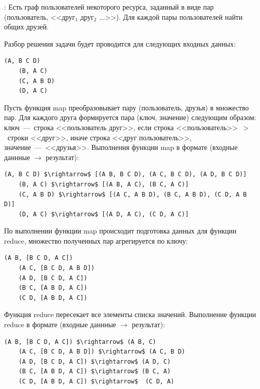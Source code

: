 \documentclass[12pt,a4paper,oneside]{extarticle}
\begin{document}
            {:} Есть граф пользователей некоторого ресурса, заданный в виде пар (пользователь, <<друг$_1$ друг$_2$ ...>>). Для каждой пары пользователей найти общих друзей.

            Разбор решения задачи будет проводится для следующих входных данных: 
            \lstset{}
            \begin{lstlisting}[mathescape] 
    (A, B C D)
    (B, A C)
    (C, A B D)
    (D, A C)
            \end{lstlisting}

            Пусть функция map преобразовывает пару (пользователь, друзья) в множество пар.
            Для каждого друга формируется пара (ключ, значение) следующим образом: ключ~---~строка <<пользователь друг>>, если строка <<пользователь>>~$>$~строки <<друг>>, иначе строка <<друг пользователь>>, значение~---~<<друзья>>. Выполнения функции map в формате (входные даннные $\rightarrow$ результат):

            \lstset{}
            \begin{lstlisting}[mathescape] 
    (A, B C D) $\rightarrow$ [(A B, B C D), (A C, B C D), (A D, B C D)]
    (B, A C) $\rightarrow$ [(A B, A C), (B C, A C)]
    (C, A B D) $\rightarrow$ [(A C, A B D), (B C, A B D), (C D, A B D)]
    (D, A C) $\rightarrow$ [(A D, A C), (C D, A C)]
            \end{lstlisting}
                
            По выполнении функции map происходит подготовка данных для функции reduce, множество полученных пар агрегируется по ключу:

            \lstset{}
            \begin{lstlisting}[mathescape] 
    (A B, [B C D, A C])
    (A C, [B C D, A B D])
    (A D, [B C D, A C])
    (B C, [A B D, A C])
    (C D, [A B D, A C])
            \end{lstlisting}

            Функция reduce пересекает все элементы списка значений. Выполнение функции reduce в формате (входные даннные $\rightarrow$ результат):

            \lstset{}
            \begin{lstlisting}[mathescape] 
    (A B, [B C D, A C]) $\rightarrow$ (A B, C)
    (A C, [B C D, A B D]) $\rightarrow$ (A C, B D)
    (A D, [B C D, A C]) $\rightarrow$ (A D, C)
    (B C, [A B D, A C]) $\rightarrow$ (B C, A)
    (C D, [A B D, A C]) $\rightarrow$  (C D, A)
            \end{lstlisting}
\end{document}
